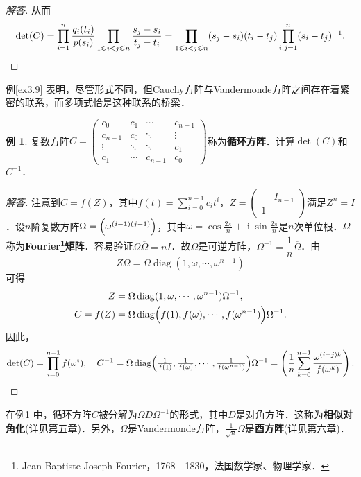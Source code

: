 \documentclass[a4paper,fontset=windows]{ctexbook}
\theoremstyle{definition}
\newtheorem{example}{例}[chapter]
\DeclareMathOperator{\diag}{diag}
\DeclareMathOperator{\I}{i}
\renewcommand{\le}{\leqslant}
\begin{document}
\begin{proof}[解答]
从而
\begin{equation*}
\det(C)=\prod_{i=1}^n\frac{q_i(t_i)}{p(s_i)}\prod_{1\le i<j\le n}\frac{s_j-s_i}{t_j-t_i}=\prod_{1\le i<j\le n}(s_j-s_i)(t_i-t_j)\prod_{i,j=1}^n(s_i-t_j)^{-1}.\qedhere
\end{equation*}
\end{proof}

例\ref{ex3.9} 表明，尽管形式不同，但Cauchy方阵与Vandermonde方阵之间存在着紧密的联系，而多项式恰是这种联系的桥梁．

\begin{example}\label{ex3.10}
复数方阵$C=\begin{pmatrix}c_0&c_1&\cdots&c_{n-1} \\ c_{n-1}&c_0&\ddots&\vdots \\ \vdots&\ddots&\ddots&c_1 \\ c_1&\cdots&c_{n-1}&c_0\end{pmatrix}$称为{\bf 循环方阵}．计算$\det(C)$和$C^{-1}$．
\end{example}

\begin{proof}[解答]
注意到$C=f(Z)$，其中$f(t)=\sum\limits_{i=0}^{n-1}c_it^i$，$Z=\begin{pmatrix}&I_{n-1} \\ 1&\end{pmatrix}$满足$Z^n=I$．设$n$阶复数方阵$\Omega=\Bigl(\omega^{(i-1)(j-1)}\Bigr)$，其中$\omega=\cos\frac{2\pi}{n}+\I\sin\frac{2\pi}{n}$是$n$次单位根．$\Omega$称为{\bf Fourier\footnote{Jean-Baptiste Joseph Fourier，1768—1830，法国数学家、物理学家．}矩阵}．容易验证$\Omega\overline{\Omega}=n I$．故$\Omega$是可逆方阵，$\Omega^{-1}=\dfrac{1}{n}\overline{\Omega}$．由
$$Z\Omega=\Omega\diag(1,\omega,\cdots,\omega^{n-1})$$
可得
\begin{align*}
Z&=\Omega\diag(1,\omega,\cdots,\omega^{n-1})\Omega^{-1},\\  C=f(Z)&=\Omega\diag\Bigl(f(1),f(\omega),\cdots,f(\omega^{n-1})\Bigr)\Omega^{-1}.
\end{align*}
因此，
\begin{equation*}
\det(C)=\prod_{i=0}^{n-1}f(\omega^i),\quad C^{-1}=\Omega\diag\Bigl(\tfrac{1}{f(1)},\tfrac{1}{f(\omega)},\cdots,\tfrac{1}{f(\omega^{n-1})}\Bigr)\Omega^{-1}=\left(\frac{1}{n}\sum_{k=0}^{n-1}\frac{\omega^{(i-j)k}}{f(\omega^k)}\right).\qedhere
\end{equation*}
\end{proof}

\medskip 在例\ref{ex3.10} 中，循环方阵$C$被分解为$\Omega D\Omega^{-1}$的形式，其中$D$是对角方阵．这称为{\bf 相似对角化}(详见第五章)．另外，$\Omega$是Vandermonde方阵，$\frac{1}{\sqrt{n}}\Omega$是{\bf 酉方阵}(详见第六章)．
\end{document}
